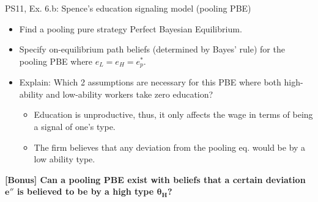 \begin{frame}{PS11, Ex. 6.b: Spence’s education signaling model (pooling PBE)}
    \begin{itemize}
      \item[(b)] Find a pooling pure strategy Perfect Bayesian Equilibrium.
    \end{itemize}\vspace{-8pt}
    \begin{multicols}{2}
      \begin{itemize}
        \item[Step 1:] Specify on-equilibrium path beliefs (determined by Bayes' rule) for the pooling PBE where $e_L=e_H=e_p^*$.
        \item[Step 8:] Explain: Which 2 assumptions are necessary for this PBE where both high-ability and low-ability workers take zero education?
        \begin{itemize}\normalsize
          \item[8.i] Education is unproductive, thus, it only affects the wage in terms of being a signal of one's type.
          \item[8.ii] The firm believes that any deviation from the pooling eq. would be by a low ability type.
        \end{itemize}
      \end{itemize}\vspace{-8pt}
      \textbf{[Bonus] Can a pooling PBE exist with beliefs that a certain deviation $\bm{e''}$ is believed to be by a high type $\bm{\theta_H}$?}
      \vfill\null\columnbreak
\end{multicols}
\end{frame}
